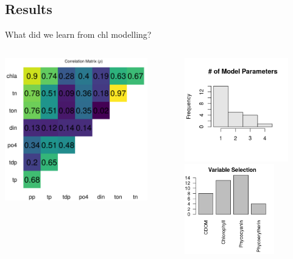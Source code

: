 \documentclass[compress,noflama,nosectionpages]{beamer}
\begin{document}
\subsection{Results}
\begin{frame}{What did we learn from chl modelling?}
	\begin{columns}
		\begin{column}[c]{6cm}
			\vspace{-2em}
			\includegraphics[width=6.2cm,keepaspectratio=true]{figures/chlcor_heatmap.png}
		\end{column}
		\begin{column}[c]{6cm}
			\begin{center}
			\includegraphics[width=4.5cm,keepaspectratio=true,clip=TRUE,trim= 0mm 5mm 0mm 7mm]{figures/modelparam_counts.png}\\
			\includegraphics[width=3.9cm,keepaspectratio=true,clip=TRUE,trim= 0mm 0mm 0mm 2mm]{figures/modelparam_hist.png}
			\end{center}
		\end{column}
	\end{columns}
\end{frame}
\end{document}
